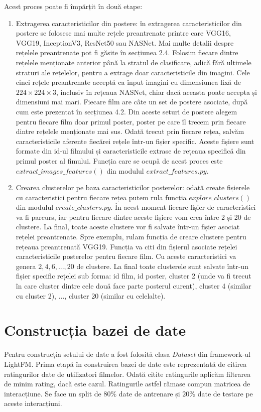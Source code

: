Acest proces poate fi împărțit în două etape:
\begin{enumerate}
	\item Extragerea caracteristicilor din postere: în extragerea caracteristicilor din postere se folosesc mai multe rețele preantrenate printre care VGG16, VGG19, InceptionV3, ResNet50 sau NASNet. Mai multe detalii despre rețelele preantrenate pot fi găsite în secțiunea 2.4. Folosim fiecare dintre rețelele menționate anterior până la stratul de clasificare, adică fără ultimele straturi ale rețelelor, pentru a extrage doar caracteristicile din imagini. Cele cinci rețele preantrenate acceptă ca înput imagini cu dimensiunea fixă de $224 \times 224 \times 3$, inclusiv în rețeaua NASNet, chiar dacă aceasta poate accepta și dimensiuni mai mari. Fiecare film are câte un set de postere asociate, după cum este prezentat în secțiunea 4.2. Din aceste seturi de postere alegem pentru fiecare film doar primul poster, poster pe care îl trecem prin fiecare dintre rețelele menționate mai sus. Odată trecut prin fiecare rețea, salvăm caracteristicile aferente fiecărei rețele într-un fișier specific. Aceste fișiere sunt formate din id-ul filmului și caracteristicile extrase de rețeaua specifică din primul poster al fimului.
Funcția care se ocupă de acest proces este $extract\_images\_features()$ din modulul $extract\_features.py$.
	\item Crearea clusterelor pe baza caracteristicilor posterelor: odată create fișierele cu caracteristici pentru fiecare rețea putem rula funcția $explore\_clusters()$ din modulul $create\_clusters.py$. În acest moment fiecare fișier de caracteristici va fi parcurs, iar pentru fiecare dintre aceste fișiere vom crea între 2 și 20 de clustere. La final, toate aceste clustere vor fi salvate într-un fișier asociat rețelei preantrenate. Spre exemplu, rulam funcția de creare clustere pentru rețeaua preantrenată VGG19. Funcția va citi din fișierul asociate rețelei caracteristicile posterelor pentru fiecare film. Cu aceste caracteristici va genera $2, 4, 6, ..., 20$ de clustere. La final toate clusterele sunt salvate într-un fișier specific rețelei sub forma: id film, id poster, cluster 2 (unde va fi trecut în care cluster dintre cele două face parte posterul curent), cluster 4 (similar cu cluster 2), ..., cluster 20 (similar cu celelalte).
\end{enumerate}

\section{Construcția bazei de date}
Pentru construcția setului de date a fost folosită clasa \textit{Dataset} din framework-ul LightFM. Prima etapă în construirea bazei de date este reprezentată de citirea ratingurilor date de utilizatori filmelor. Odată citite ratingurile aplicăm filtrarea de minim rating, dacă este cazul. Ratingurile astfel rămase compun matricea de interacțiune. Se face un split de $80\%$ date de antrenare și $20\%$ date de testare pe aceste interacțiuni.

